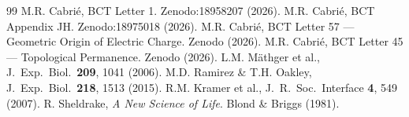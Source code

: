 \documentclass[twocolumn,10pt]{article}
\begin{document}
\begin{thebibliography}{99}
 M.R. Cabri\'{e}, BCT Letter 1. Zenodo:18958207 (2026).
 M.R. Cabri\'{e}, BCT Appendix JH. Zenodo:18975018 (2026).
 M.R. Cabri\'{e}, BCT Letter 57 --- Geometric Origin of Electric Charge. Zenodo (2026).
 M.R. Cabri\'{e}, BCT Letter 45 --- Topological Permanence. Zenodo (2026).
 L.M. M\"{a}thger et al., J.\ Exp.\ Biol.\ \textbf{209}, 1041 (2006).
 M.D. Ramirez \& T.H. Oakley, J.\ Exp.\ Biol.\ \textbf{218}, 1513 (2015).
 R.M. Kramer et al., J.\ R.\ Soc.\ Interface \textbf{4}, 549 (2007).
 R. Sheldrake, \textit{A New Science of Life}. Blond \& Briggs (1981).
\end{thebibliography}
\end{document}
